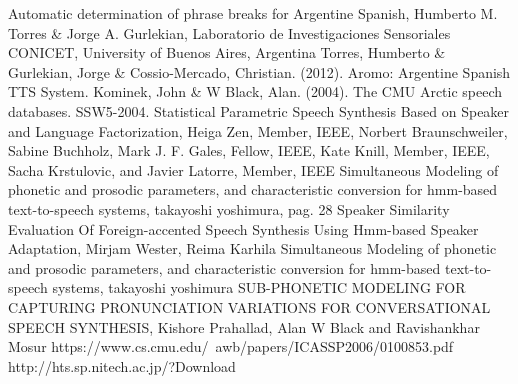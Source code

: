 \begin{thebibliography}{9}

 Automatic determination of phrase breaks for Argentine Spanish, Humberto M. Torres \& Jorge A. Gurlekian, Laboratorio de Investigaciones Sensoriales CONICET, University of Buenos Aires, Argentina
 Torres, Humberto \& Gurlekian, Jorge \& Cossio-Mercado, Christian. (2012). Aromo: Argentine Spanish TTS System.
 Kominek, John \& W Black, Alan. (2004). The CMU Arctic speech databases. SSW5-2004.
 Statistical Parametric Speech Synthesis Based on Speaker and Language Factorization, Heiga Zen, Member, IEEE, Norbert Braunschweiler, Sabine Buchholz, Mark J. F. Gales, Fellow, IEEE, Kate Knill, Member, IEEE, Sacha Krstulovic, and Javier Latorre, Member, IEEE
 Simultaneous Modeling of phonetic and prosodic parameters, and characteristic conversion for hmm-based text-to-speech systems, takayoshi yoshimura, pag. 28
 Speaker Similarity Evaluation Of Foreign-accented Speech Synthesis Using Hmm-based Speaker Adaptation, Mirjam Wester, Reima Karhila
 Simultaneous Modeling of phonetic and prosodic parameters, and characteristic conversion for hmm-based text-to-speech systems, takayoshi yoshimura
 SUB-PHONETIC MODELING FOR CAPTURING PRONUNCIATION VARIATIONS FOR CONVERSATIONAL SPEECH SYNTHESIS, Kishore Prahallad, Alan W Black and Ravishankhar Mosur https://www.cs.cmu.edu/~awb/papers/ICASSP2006/0100853.pdf
 http://hts.sp.nitech.ac.jp/?Download
\end{thebibliography}